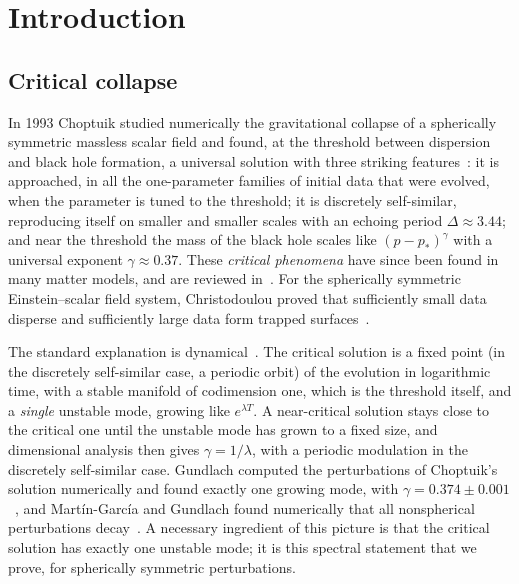 \section{Introduction}\label{sec:intro}

\subsection{Critical collapse}

In 1993 Choptuik studied numerically the gravitational collapse of a spherically symmetric massless scalar field
and found, at the threshold between dispersion and black hole formation, a universal solution with three striking
features~\cite{Choptuik1993}: it is approached, in all the one-parameter families of initial data that were evolved, when the
parameter is tuned to the threshold; it is discretely self-similar, reproducing itself on smaller and smaller scales with an echoing period
$\Delta\approx3.44$; and near the threshold the mass of the black hole scales like $(p-p_*)^\gamma$ with a universal
exponent $\gamma\approx0.37$. These \emph{critical phenomena} have since been found in many matter models, and are
reviewed in~\cite{GundlachMartinGarcia2007}. For the spherically symmetric Einstein--scalar field system, Christodoulou proved that
sufficiently small data disperse and sufficiently large data form trapped surfaces~\cite{Christodoulou1986,
Christodoulou1991,Christodoulou1993}.

The standard explanation is dynamical~\cite{KoikeHaraAdachi1995,Gundlach1997}. The critical solution is a fixed
point (in the discretely self-similar case, a periodic orbit) of the evolution in logarithmic time, with a stable
manifold of codimension one, which is the threshold itself, and a \emph{single} unstable mode, growing like
$e^{\lambda T}$. A near-critical solution stays close to the critical one until the unstable mode has grown to a
fixed size, and dimensional analysis then gives $\gamma=1/\lambda$, with a periodic modulation in the discretely
self-similar case. Gundlach computed the perturbations of Choptuik's solution numerically and found exactly one growing mode,
with $\gamma=0.374\pm0.001$~\cite{Gundlach1997}, and Mart\'in-Garc\'ia and Gundlach found numerically that all
nonspherical perturbations decay~\cite{MartinGarciaGundlach1999}. A necessary ingredient of this picture is that the
critical solution has exactly one unstable mode; it is this spectral statement that we prove, for spherically
symmetric perturbations.

